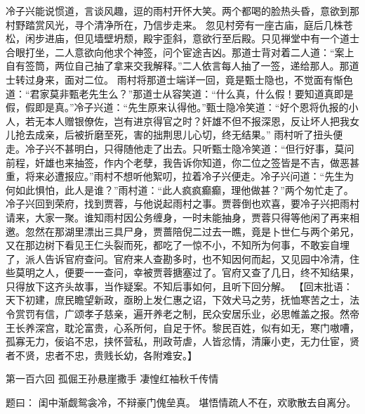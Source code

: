 \documentclass[12pt,oneside]{book}
\begin{document}
冷子兴能说惯道，言谈风趣，逗的雨村开怀大笑。两个都喝的脸热头昏，意欲到那村野踏赏风光，寻个清净所在，乃信步走来。
忽见村旁有一座古庙，庭后几株苍松，闲步进庙，但见墙壁坍颓，殿宇歪斜，意欲行至后殿。只见禅堂中有一个道士合眼打坐，二人意欲向他求个神签，问个宦途吉凶。那道士背对着二人道：“案上自有签筒，两位自己抽了拿来交我解释。”二人依言每人抽了一签，递给那人。那道士转过身来，面对二位。
雨村将那道士端详一回，竟是甄士隐也，不觉面有惭色道：“君家莫非甄老先生么？”那道士从容笑道：“什么真，什么假！要知道真即是假，假即是真。”冷子兴道：“先生原来认得他。”甄士隐冷笑道：“好个恩将仇报的小人，若无本人赠银僚佐，岂有进京得官之时？奸雄不但不报深恩，反让坏人把我女儿抢去成亲，后被折磨至死，害的拙荆思儿心切，终无结果。”
雨村听了扭头便走。冷子兴不甚明白，只得随他走了出去。只听甄士隐冷笑道：“但行好事，莫问前程，奸雄也来抽签，作内个老孽，我告诉你知道，你二位之签皆是不吉，做恶甚重，将来必遭报应。”雨村不想听他絮叨，拉着冷子兴便走。冷子兴问道：“先生为何如此惧怕，此人是谁？”雨村道：“此人疯疯癫癫，理他做甚？”两个匆忙走了。
冷子兴回到荣府，找到贾蓉，与他说起雨村之事。贾蓉倒也欢喜，要冷子兴把雨村请来，大家一聚。谁知雨村因公务缠身，一时未能抽身，贾蓉只得等他闲了再来相邀。忽然在那湖里漂出三具尸身，贾蔷陪倪二过去一瞧，竟是卜世仁与两个弟兄，又在那边树下看见王仁头裂而死，都吃了一惊不小，不知所为何事，不敢妄自埋了，派人告诉官府查问。官府来人查勘多时，也不知因何而起，又见园中冷清，住些莫明之人，便要一一查问，幸被贾蓉搪塞过了。官府又查了几日，终不知结果，只得放下这齐头故事，当作疑案。不知后事如何，且听下回分解。
【回末批语：天下初建，庶民瞻望新政，亟盼上发仁惠之诏，下效犬马之劳，抚恤寒苦之士，法令赏罚有信，广颂孝子慈亲，遍开养老之制，民众安居乐业，必思帷盖之报。然帝王长养深宫，耽沦富贵，心系所何，自足于怀。黎民百姓，似有如无，寒门嗷嘈，孤寡无力，佞谄不忠，挟怀营私，刑政苛虐，人皆忿情，清廉小吏，无力仕宦，贤者不贤，忠者不忠，贵贱长幼，各附难安。】

 
第一百六回 孤倔王孙悬崖撒手 凄惶红袖秋千传情

题曰：
闺中渐觑鸳衾冷，不辩豪门傀垒真。
堪悟情疏人不在，欢歌散去自离分。
\end{document}

